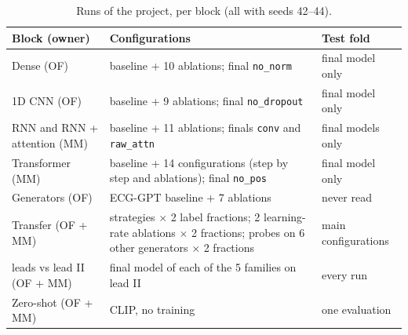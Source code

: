 \begin{table}[htbp]
\centering
\caption{Runs of the project, per block (all with seeds 42--44).}
\label{tab:runs}
\small
\begin{tabularx}{\textwidth}{>{\raggedright\arraybackslash}p{4.2cm}>{\raggedright\arraybackslash}X>{\raggedright\arraybackslash}p{2.7cm}}
\toprule
Block (owner) & Configurations & Test fold \\
\midrule
Dense (OF) & baseline + 10 ablations; final \texttt{no\_norm} & final model only \\
1D CNN (OF) & baseline + 9 ablations; final \texttt{no\_dropout} & final model only \\
RNN and RNN + attention (MM) & baseline + 11 ablations; finals \texttt{conv} and \texttt{raw\_attn} & final models only \\
Transformer (MM) & baseline + 14 configurations (step by step and ablations); final \texttt{no\_pos} & final model only \\
Generators (OF) & ECG-GPT baseline + 7 ablations & never read \\
Transfer (OF + MM) & 3 strategies $\times$ 2 label fractions; 2 learning-rate ablations $\times$ 2 fractions; probes on 6 other generators $\times$ 2 fractions & 6 main configurations \\
12 leads vs lead II (OF + MM) & final model of each of the 5 families on lead II & every run \\
Zero-shot (OF + MM) & CLIP, no training & one evaluation \\
\bottomrule
\end{tabularx}
\end{table}
